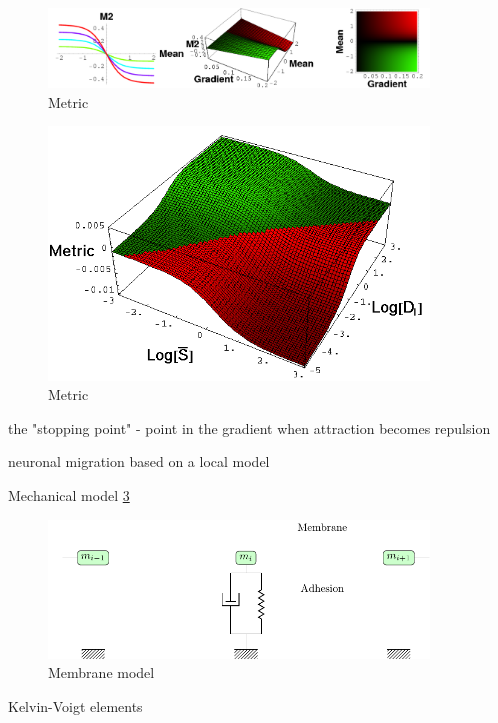 \documentclass{article}
\begin{document}
\begin{figure}
    \centering
    \includegraphics[width=0.9\textwidth]{metric.png}
    \caption{Metric \label{fig:metric}}
\end{figure}

\begin{figure}
    \centering
    \includegraphics[width=0.9\textwidth]{MetricVsAvgVsDi.png}
    \caption{Metric \label{fig:metric}}
\end{figure}


the "stopping point" - point in the gradient when attraction becomes repulsion

neuronal migration based on a local model

Mechanical model
\cref{fig:tension_fig}
\begin{figure}
    \centering
    \includegraphics[width=0.9\textwidth]{./tension_fig.pdf}
    \caption{Membrane model \label{fig:tension_fig}}
\end{figure}

Kelvin-Voigt elements
\end{document}
